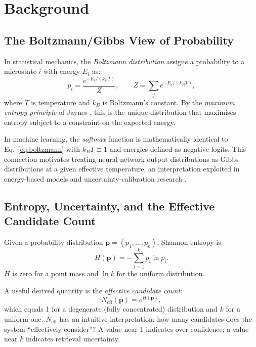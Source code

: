 \documentclass[11pt,a4paper]{article}
\theoremstyle{definition}
\begin{document}
\section{Background}
\label{sec:background}

\subsection{The Boltzmann/Gibbs View of Probability}

In statistical mechanics, the \emph{Boltzmann distribution} assigns a
probability to a microstate $i$ with energy $E_i$ as:
\begin{equation}
  p_i = \frac{e^{-E_i / (k_B T)}}{Z},
  \qquad Z = \sum_j e^{-E_j / (k_B T)},
  \label{eq:boltzmann}
\end{equation}
where $T$ is temperature and $k_B$ is Boltzmann's constant.
By the \emph{maximum entropy principle} of Jaynes
\citep{jaynes1957}, this is the unique distribution that maximises
entropy subject to a constraint on the expected energy.

In machine learning, the \emph{softmax} function is mathematically
identical to Eq.~\eqref{eq:boltzmann} with $k_B T \equiv 1$ and
energies defined as negative logits.
This connection motivates treating neural network output distributions
as Gibbs distributions at a given effective temperature, an interpretation
exploited in energy-based models \citep{lecun2006,liu2020ebm} and
uncertainty-calibration research \citep{guo2017calibration}.

\subsection{Entropy, Uncertainty, and the Effective Candidate Count}

Given a probability distribution $\mathbf{p} = (p_1,\ldots,p_k)$,
Shannon entropy \citep{shannon1948} is:
\begin{equation}
  H(\mathbf{p}) = -\sum_{i=1}^{k} p_i \ln p_i.
  \label{eq:entropy}
\end{equation}
$H$ is zero for a point mass and $\ln k$ for the uniform distribution.

A useful derived quantity is the \emph{effective candidate count}:
\begin{equation}
  N_\text{eff}(\mathbf{p}) = e^{H(\mathbf{p})},
  \label{eq:neff}
\end{equation}
which equals 1 for a degenerate (fully concentrated) distribution and
$k$ for a uniform one.
$N_\text{eff}$ has an intuitive interpretation: how many candidates
does the system ``effectively consider''?
A value near 1 indicates over-confidence; a value near $k$ indicates
retrieval uncertainty.
\end{document}
